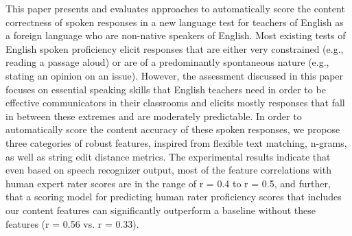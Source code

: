 This paper presents and evaluates approaches to automatically score the content correctness of spoken responses in a new language test for teachers of English
 as a foreign language who are non-native speakers of English. Most existing
 tests of English spoken proficiency elicit responses that are either very
 constrained (e.g., reading a passage aloud) or are of a predominantly
 spontaneous nature (e.g., stating an opinion on an issue). However, the
 assessment discussed in this paper focuses on essential speaking skills that
 English teachers need in order to be effective communicators in their
 classrooms and elicits mostly responses that fall in between these extremes and
 are moderately predictable. In order to automatically score the content
 accuracy of these spoken responses, we propose three categories of robust
 features, inspired from flexible text matching, n-grams, as well as string edit
 distance metrics. The experimental results indicate that even based on speech
 recognizer output, most of the feature correlations with human expert rater
 scores are in the range of r = 0.4 to r = 0.5, and further, that a scoring
 model for predicting human rater proficiency scores that includes our content
 features can significantly outperform a baseline without these features (r =
 0.56 vs. r = 0.33).

